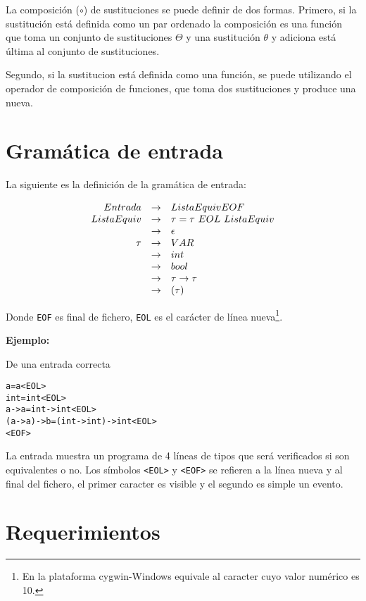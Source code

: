 \documentclass{article}
\begin{document}
La composición ($\circ$) de sustituciones se puede definir de dos
formas. Primero, si la sustitución está definida como un par ordenado
la composición es una función que toma un conjunto de sustituciones
$\Theta$ y una sustitución $\theta$ y adiciona está última al conjunto
de sustituciones.

Segundo, si la sustitucion está definida como una
función, se puede utilizando el operador de composición de funciones,
que toma dos sustituciones y produce una nueva.

\section{Gramática de entrada}
\label{sec:gramatica-de-entrada}

La siguiente es la definición de la gramática de entrada:

\[
  \begin{array}[h]{rcl}
    Entrada & \to  & ListaEquiv EOF \\
    ListaEquiv & \to & \tau = \tau\ EOL\ ListaEquiv\\
            & \to & \epsilon \\
    \tau    & \to & VAR \\
            & \to & int \\
            & \to & bool \\
            & \to & \tau \to \tau \\
            & \to & (\tau) \\
  \end{array}
\]

Donde \texttt{EOF} es final de fichero, \texttt{EOL} es el carácter de
línea nueva\footnote{En la plataforma cygwin-Windows equivale al
  caracter cuyo valor numérico es 10.}.

\textbf{Ejemplo:}

De una entrada correcta

\begin{alltt}
a = a <EOL>
int = int <EOL>
a -> a = int -> int <EOL>
(a -> a) -> b = (int -> int) -> int <EOL>
<EOF>
\end{alltt}

La entrada muestra un programa de 4 líneas de tipos que será
verificados si son equivalentes o no. Los símbolos \verb!<EOL>! y
\verb!<EOF>! se refieren a la línea nueva y al final del fichero, el
primer caracter es visible y el segundo es simple un evento.
\section{Requerimientos}
\label{sec:requerimientos}
\end{document}
